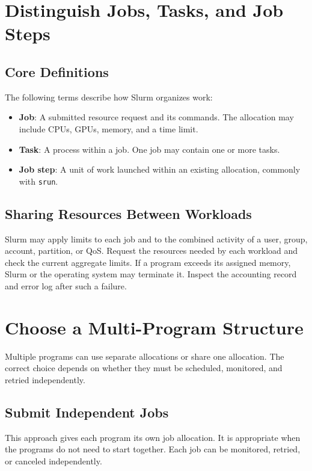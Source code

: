 \documentclass[11pt,oneside]{memoir}
\begin{document}
\section{Distinguish Jobs, Tasks, and Job Steps}
\label{sec:resource-allocation}

\subsection{Core Definitions}
\label{subsec:jobs-tasks}
The following terms describe how Slurm organizes work:
\begin{itemize}
    \item \textbf{Job}: A submitted resource request and its commands. The allocation may include CPUs, GPUs, memory, and a time limit.
    \item \textbf{Task}: A process within a job. One job may contain one or more tasks.
    \item \textbf{Job step}: A unit of work launched within an existing allocation, commonly with \texttt{srun}.
\end{itemize}

\subsection{Sharing Resources Between Workloads}
\label{subsec:resource-sharing}
Slurm may apply limits to each job and to the combined activity of a user, group, account, partition, or QoS. Request the resources needed by each workload and check the current aggregate limits. If a program exceeds its assigned memory, Slurm or the operating system may terminate it. Inspect the accounting record and error log after such a failure.

\section{Choose a Multi-Program Structure}
\label{subsec:workload-strategies}
Multiple programs can use separate allocations or share one allocation. The correct choice depends on whether they must be scheduled, monitored, and retried independently.

\subsection{Submit Independent Jobs}
\label{par:independent-jobs}
This approach gives each program its own job allocation. It is appropriate when the programs do not need to start together. Each job can be monitored, retried, or canceled independently.
\end{document}

